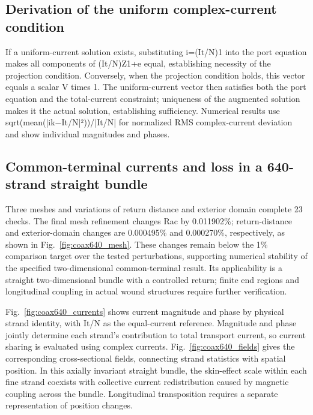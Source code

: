 \subsection{Derivation of the uniform complex-current condition}

\hypertarget{04.sharing_derivation.p1}{}
If a uniform-current solution exists, substituting i=(It/N)1 into the port equation makes all components of (It/N)Z1+e equal, establishing necessity of the projection condition. Conversely, when the projection condition holds, this vector equals a scalar V times 1. The uniform-current vector then satisfies both the port equation and the total-current constraint; uniqueness of the augmented solution makes it the actual solution, establishing sufficiency. Numerical results use sqrt(mean(|ik−It/N|²))/|It/N| for normalized RMS complex-current deviation and show individual magnitudes and phases.

\hypertarget{04.coax_results.heading}{}
\subsection{Common-terminal currents and loss in a 640-strand straight bundle}

\hypertarget{04.coax_results.p1}{}
Three meshes and variations of return distance and exterior domain complete 23 checks. The final mesh refinement changes Rac by 0.011902\%; return-distance and exterior-domain changes are 0.000495\% and 0.000270\%, respectively, as shown in Fig.~\ref{fig:coax640_mesh}. These changes remain below the 1\% comparison target over the tested perturbations, supporting numerical stability of the specified two-dimensional common-terminal result. Its applicability is a straight two-dimensional bundle with a controlled return; finite end regions and longitudinal coupling in actual wound structures require further verification.

\hypertarget{04.coax_results.p2}{}
Fig.~\ref{fig:coax640_currents} shows current magnitude and phase by physical strand identity, with It/N as the equal-current reference. Magnitude and phase jointly determine each strand's contribution to total transport current, so current sharing is evaluated using complex currents. Fig.~\ref{fig:coax640_fields} gives the corresponding cross-sectional fields, connecting strand statistics with spatial position. In this axially invariant straight bundle, the skin-effect scale within each fine strand coexists with collective current redistribution caused by magnetic coupling across the bundle. Longitudinal transposition requires a separate representation of position changes.

